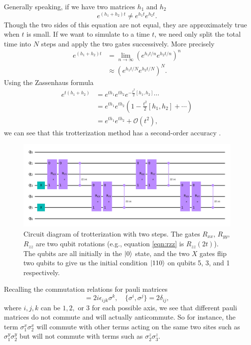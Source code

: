 \documentclass[aps,prl, reprint]{revtex4-2}
\begin{document}
Generally speaking, if we have two matrices $h_1$ and $h_2$
\begin{equation}
e^{(h_1 + h_2)t} \neq e^{h_1 t}e^{h_2 t}.
\end{equation}
Though the two sides of this equation are not equal, they are approximately true when $t$ is small. If we want to simulate to a time $t$, we need only split the total time into $N$ steps and apply the two gates successively. More precisely
\begin{align}
e^{(h_1 + h_2)t}&=\lim _{n \rightarrow \infty}\left(e^{h_1 t/ n} e^{h_2 t / n}\right)^{n}\\
&\approx \left(e^{h_1 t / N} e^{h_2 t/ N}\right)^{N}.
\end{align}
Using the Zassenhaus formula 
\begin{align*}
e^{t(h_1+h_2)}&=e^{t h_1} e^{t h_2} e^{-\frac{t^{2}}{2}[h_1, h_2]}\cdots\\
&= e^{t h_1} e^{t h_2}(1 -\frac{t^{2}}{2}[h_1, h_2] + \cdots)\\
&=e^{t h_1} e^{t h_2} + \mathcal{O}(t^2),
\end{align*}
we can see that this trotterization method has a second-order accuracy \cite{dupays2021closed}.
\begin{figure}[t]
\includegraphics[width=\textwidth]{../Trotterization.png}
\caption{Circuit diagram of trotterization with two steps. The gates $R_{xx}$, $R_{yy}$, $R_{zz}$ are two qubit rotations (e.g., equation \ref{eqn:rzz} is $R_{zz}(2t)$). The qubits are all initially in the $\ket{0}$ state, and the two $X$ gates flip two qubits to give us the initial condition $\ket{110}$ on qubits 5, 3, and 1 respectively.}
\label{fig:TrotterCircuit}
\end{figure}

Recalling the commutation relations for pauli matrices
\begin{equation}
[\sigma^{i}, \sigma^{j}] = 2i \epsilon_{ijk}\sigma^{k}, \quad \{\sigma^{i}, \sigma^{j}\} = 2\delta_{ij	},
\end{equation}
where $i,j,k$ can be $1,2,$ or 3 for each possible axis, we see that different pauli matrices do not commute and will actually anticommute. So for instance, the term $\sigma_{1}^{x} \sigma_{2}^{x}$ will commute with other terms acting on the same two sites such as $\sigma_{1}^{y} \sigma_{2}^{y}$ but will not commute with terms such as $\sigma_{2}^{z} \sigma_{3}^{z}$.
\end{document}
